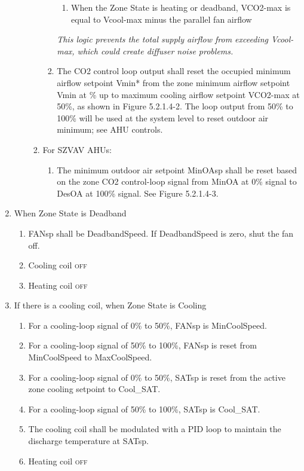 \documentclass[10pt]{article}
\begin{document}
\begin{enumerate}
\begin{enumerate}
\begin{enumerate}
\begin{enumerate}
\begin{enumerate}
            \item When the Zone State is heating or deadband, VCO2-max is equal to Vcool-max minus the parallel fan airflow
          \end{enumerate}
          \textit{This logic prevents the total supply airflow from exceeding Vcool-max, which could create diffuser noise problems.}
          \item The CO2 control loop output shall reset the occupied minimum airflow setpoint Vmin* from the zone minimum airflow setpoint Vmin at \% up to maximum cooling airflow setpoint VCO2-max at 50\%, as shown in Figure 5.2.1.4-2. The loop output from 50\% to 100\% will be used at the system level to reset outdoor air minimum; see AHU controls.
        \end{enumerate}
        \item For SZVAV AHUs:
        \begin{enumerate}
         \item The minimum outdoor air setpoint MinOAsp shall be reset based on the zone CO2 control-loop signal from MinOA at 0\% signal to DesOA at 100\% signal. See Figure 5.2.1.4-3.
        \end{enumerate}
      \end{enumerate}
    \end{enumerate}
    \item When Zone State is Deadband
    \begin{enumerate}
      \item FANsp shall be DeadbandSpeed.  If DeadbandSpeed is zero, shut the fan off.
      \item Cooling coil \textsc{off}
      \item Heating coil \textsc{off}
    \end{enumerate}
    \item If there is a cooling coil, when Zone State is Cooling
    \begin{enumerate}
      \item For a cooling-loop signal of 0\% to 50\%, FANsp is MinCoolSpeed.
      \item For a cooling-loop signal of 50\% to 100\%, FANsp is reset from MinCoolSpeed to MaxCoolSpeed.
      \item For a cooling-loop signal of 0\% to 50\%, SATsp is reset from the active zone cooling setpoint to Cool\_SAT.
      \item For a cooling-loop signal of 50\% to 100\%, SATsp is Cool\_SAT.   
      \item The cooling coil shall be modulated with a PID loop to maintain the discharge temperature at SATsp.
      \item Heating coil \textsc{off}
    \end{enumerate}
  \end{enumerate}
\fi
\end{document}
